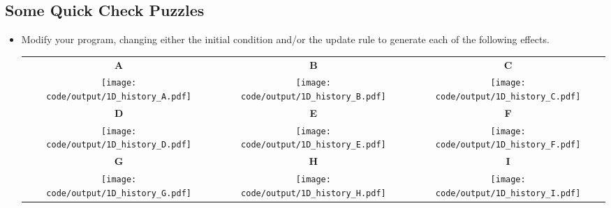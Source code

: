 \documentclass{coderdojo}
\newcommand\TODO[1]{
\begin{itemize}
\item[\todoSymbol] \color{todo} #1
\end{itemize}}
\begin{document}


\subsection*{Some Quick Check Puzzles}
\TODO{Modify your  program, changing either the initial condition and/or the update rule to generate each of the following effects.

\noindent
\begin{tabular}{@{}ccc}
{\bf A} & {\bf B} &  {\bf C} \\
{\texttt{[image: code/output/1D\_history\_A.pdf]}} &
{\texttt{[image: code/output/1D\_history\_B.pdf]}} &
{\texttt{[image: code/output/1D\_history\_C.pdf]}} \\
{\bf D} & {\bf E} &  {\bf F} \\
{\texttt{[image: code/output/1D\_history\_D.pdf]}} &
{\texttt{[image: code/output/1D\_history\_E.pdf]}} &
{\texttt{[image: code/output/1D\_history\_F.pdf]}} \\
{\bf G} & {\bf H} &  {\bf I} \\
{\texttt{[image: code/output/1D\_history\_G.pdf]}} &
{\texttt{[image: code/output/1D\_history\_H.pdf]}} &
{\texttt{[image: code/output/1D\_history\_I.pdf]}} \\

\end{tabular}
}


\end{document}
